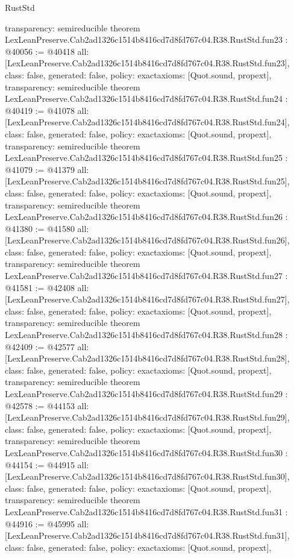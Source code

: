 \begin{lexlean}{RustStd}
\begin{coremodule}
{  transparency: semireducible
}
theorem LexLeanPreserve.Cab2ad1326c1514b8416cd7d8fd767c04.R38.RustStd.fun23 : @40056 := @40418 {
  all: [LexLeanPreserve.Cab2ad1326c1514b8416cd7d8fd767c04.R38.RustStd.fun23],
  class: false,
  generated: false,
  policy: exact{axioms: [Quot.sound, propext]},
  transparency: semireducible
}
theorem LexLeanPreserve.Cab2ad1326c1514b8416cd7d8fd767c04.R38.RustStd.fun24 : @40419 := @41078 {
  all: [LexLeanPreserve.Cab2ad1326c1514b8416cd7d8fd767c04.R38.RustStd.fun24],
  class: false,
  generated: false,
  policy: exact{axioms: [Quot.sound, propext]},
  transparency: semireducible
}
theorem LexLeanPreserve.Cab2ad1326c1514b8416cd7d8fd767c04.R38.RustStd.fun25 : @41079 := @41379 {
  all: [LexLeanPreserve.Cab2ad1326c1514b8416cd7d8fd767c04.R38.RustStd.fun25],
  class: false,
  generated: false,
  policy: exact{axioms: [Quot.sound, propext]},
  transparency: semireducible
}
theorem LexLeanPreserve.Cab2ad1326c1514b8416cd7d8fd767c04.R38.RustStd.fun26 : @41380 := @41580 {
  all: [LexLeanPreserve.Cab2ad1326c1514b8416cd7d8fd767c04.R38.RustStd.fun26],
  class: false,
  generated: false,
  policy: exact{axioms: [Quot.sound, propext]},
  transparency: semireducible
}
theorem LexLeanPreserve.Cab2ad1326c1514b8416cd7d8fd767c04.R38.RustStd.fun27 : @41581 := @42408 {
  all: [LexLeanPreserve.Cab2ad1326c1514b8416cd7d8fd767c04.R38.RustStd.fun27],
  class: false,
  generated: false,
  policy: exact{axioms: [Quot.sound, propext]},
  transparency: semireducible
}
theorem LexLeanPreserve.Cab2ad1326c1514b8416cd7d8fd767c04.R38.RustStd.fun28 : @42409 := @42577 {
  all: [LexLeanPreserve.Cab2ad1326c1514b8416cd7d8fd767c04.R38.RustStd.fun28],
  class: false,
  generated: false,
  policy: exact{axioms: [Quot.sound, propext]},
  transparency: semireducible
}
theorem LexLeanPreserve.Cab2ad1326c1514b8416cd7d8fd767c04.R38.RustStd.fun29 : @42578 := @44153 {
  all: [LexLeanPreserve.Cab2ad1326c1514b8416cd7d8fd767c04.R38.RustStd.fun29],
  class: false,
  generated: false,
  policy: exact{axioms: [Quot.sound, propext]},
  transparency: semireducible
}
theorem LexLeanPreserve.Cab2ad1326c1514b8416cd7d8fd767c04.R38.RustStd.fun30 : @44154 := @44915 {
  all: [LexLeanPreserve.Cab2ad1326c1514b8416cd7d8fd767c04.R38.RustStd.fun30],
  class: false,
  generated: false,
  policy: exact{axioms: [Quot.sound, propext]},
  transparency: semireducible
}
theorem LexLeanPreserve.Cab2ad1326c1514b8416cd7d8fd767c04.R38.RustStd.fun31 : @44916 := @45995 {
  all: [LexLeanPreserve.Cab2ad1326c1514b8416cd7d8fd767c04.R38.RustStd.fun31],
  class: false,
  generated: false,
  policy: exact{axioms: [Quot.sound, propext]},
}
\end{coremodule}
\end{lexlean}
